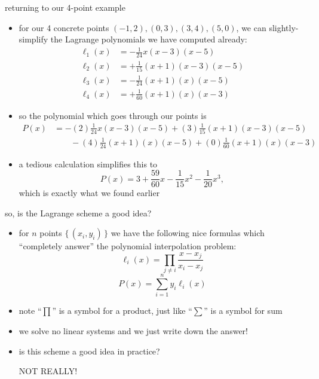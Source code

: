 \documentclass[10pt,hyperref]{beamer}
\begin{document}
\begin{frame}{returning to our 4-point example}

\begin{itemize}
\item for our 4 concrete points $(-1,2), (0,3), (3,4), (5,0)$, we can slightly-simplify the Lagrange polynomials we have  computed already:
\small
\begin{align*}
\ell_{1}(x) &= - \frac{1}{24} x (x-3) (x-5) \\
\ell_{2}(x) &= + \frac{1}{15} (x+1) (x-3) (x-5) \\
\ell_{3}(x) &= - \frac{1}{24} (x+1) (x) (x-5) \\
\ell_{4}(x) &= + \frac{1}{60} (x+1) (x) (x-3)
\end{align*}
\normalsize
\item so the polynomial which goes through our points is
\small
\begin{align*}
P(x) &= - (2) \frac{1}{24} x (x-3) (x-5) + (3) \frac{1}{15} (x+1) (x-3) (x-5) \\ 
     &\qquad - (4) \frac{1}{24} (x+1) (x) (x-5) + (0) \frac{1}{60} (x+1) (x) (x-3)
\end{align*}
\normalsize
\item a tedious calculation simplifies this to
	$$P(x)=3 + \frac{59}{60} x - \frac{1}{15} x^2 - \frac{1}{20} x^3,$$
which is exactly what we found earlier
\end{itemize}
\end{frame}


\begin{frame}{so, is the Lagrange scheme a good idea?}

\begin{itemize}
\item for $n$ points $\{\,(x_i,y_i)\,\}$ we have the following nice formulas which ``completely answer'' the polynomial interpolation problem:
	$$\ell_i(x) = \prod_{j\ne i} \frac{x-x_j}{x_i-x_j}$$
	$$P(x) = \sum_{i=1}^n y_i \ell_i(x)$$
\item note ``$\prod$'' is a symbol for a product, just like ``$\sum$'' is a symbol for sum
\item we solve no linear systems and we just write down the answer!
\item is this scheme a good idea in practice?

 \alert{NOT REALLY!}
\end{itemize}
\end{frame}
\end{document}
